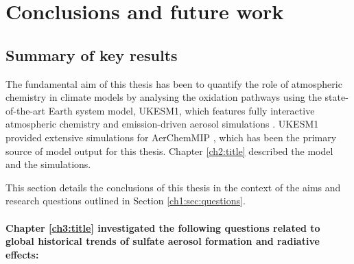 \chapter{Conclusions and future work}
\ifpdf
    \graphicspath{{Chapter6/Figs/Raster/}{Chapter6/Figs/PDF/}{Chapter6/Figs/}}
\else
    \graphicspath{{Chapte6/Figs/Vector/}{Chapter6/Figs/}}
\fi


\section{Summary of key results}

The fundamental aim of this thesis has been to quantify the role of atmospheric chemistry in climate models by analysing the  oxidation pathways using the state-of-the-art Earth system model, UKESM1, which features fully interactive atmospheric chemistry and emission-driven aerosol simulations \citep{sellarUKESM1DescriptionEvaluation2019,archibaldDescriptionEvaluationUKCA2020}. UKESM1 provided extensive simulations for AerChemMIP \citep{collinsAerChemMIPQuantifyingEffects2017}, which has been the primary source of model output for this thesis. Chapter \ref{ch2:title} described the model and the simulations.

This section details the conclusions of this thesis in the context of the aims and research questions outlined in Section \ref{ch1:sec:questions}.

\subsubsection*{Chapter \ref{ch3:title} investigated the following questions related to global historical trends of sulfate aerosol formation and radiative effects: }

